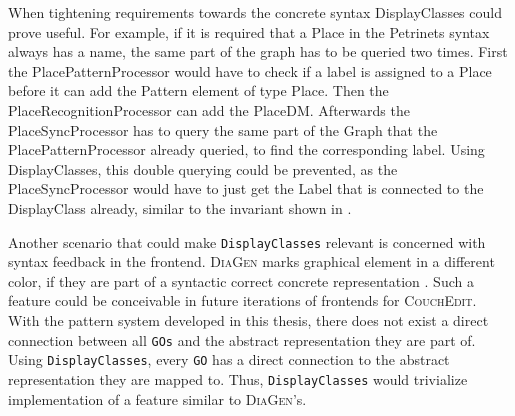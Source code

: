 When tightening requirements towards the concrete syntax DisplayClasses could prove useful. For example, if it is required that a Place in the Petrinets syntax always has a name, the same part of the graph has to be queried two times. First the PlacePatternProcessor would have to check if a label is assigned to a Place before it can add the Pattern element of type Place. Then the PlaceRecognitionProcessor can add the PlaceDM. Afterwards the PlaceSyncProcessor has to query the same part of the Graph that the PlacePatternProcessor already queried, to find the corresponding label. Using DisplayClasses, this double querying could be prevented, as the PlaceSyncProcessor would have to just get the Label that is connected to the DisplayClass already, similar to the invariant shown in .


Another scenario that could make \texttt{DisplayClasses} relevant is concerned with syntax feedback in the frontend. \textsc{DiaGen} marks graphical element in a different color, if they are part of a syntactic correct concrete representation \cite{minas_concepts_2002}. Such a feature could be conceivable in future iterations of frontends for \textsc{CouchEdit}. With the pattern system developed in this thesis, there does not exist a direct connection between all \texttt{GOs} and the abstract representation they are part of. Using \texttt{DisplayClasses}, every \texttt{GO} has a direct connection to the abstract representation they are mapped to. Thus, \texttt{DisplayClasses} would trivialize implementation of a feature similar to \textsc{DiaGen}'s.



